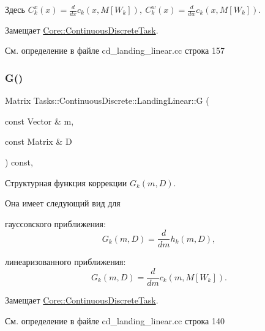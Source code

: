 Здесь $C_k^x(x) = \frac{d}{dx} c_k(x, M[W_k]),\ C_k^w(x) = \frac{d}{dw} c_k(x, M[W_k])$. 

Замещает \hyperlink{class_core_1_1_continuous_discrete_task_a08947ea4d4eb819e0e8530e682a1a377}{Core\+::\+Continuous\+Discrete\+Task}.



См. определение в файле cd\+\_\+landing\+\_\+linear.\+cc строка 157

\hypertarget{class_tasks_1_1_continuous_discrete_1_1_landing_linear_a3b589b0ac53f7fe936438bc7c82f5c3d}{}\label{class_tasks_1_1_continuous_discrete_1_1_landing_linear_a3b589b0ac53f7fe936438bc7c82f5c3d} 
\subsubsection{\texorpdfstring{G()}{G()}}
{\footnotesize\ttfamily Matrix Tasks\+::\+Continuous\+Discrete\+::\+Landing\+Linear\+::G (\begin{DoxyParamCaption}\item[{const Vector \&}]{m,  }\item[{const Matrix \&}]{D }\end{DoxyParamCaption}) const\hspace{0.3cm}{\ttfamily [override]}, {\ttfamily [virtual]}}



Структурная функция коррекции $G_k(m, D)$. 

Она имеет следующий вид для


\begin{DoxyItemize}
\item гауссовского приближения\+: \[G_k(m, D) = \frac{d}{dm}h_k(m,D),\]
\item линеаризованного приближения\+: \[G_k(m, D) = \frac{d}{dm}c_k(m,M[W_k]).\] 
\end{DoxyItemize}

Замещает \hyperlink{class_core_1_1_continuous_discrete_task_a2bc6d34d112ec0999857f7f9e0f67dda}{Core\+::\+Continuous\+Discrete\+Task}.



См. определение в файле cd\+\_\+landing\+\_\+linear.\+cc строка 140

\hypertarget{class_tasks_1_1_continuous_discrete_1_1_landing_linear_a66480881fd719faddafe5104b548db78}{}\label{class_tasks_1_1_continuous_discrete_1_1_landing_linear_a66480881fd719faddafe5104b548db78} 
